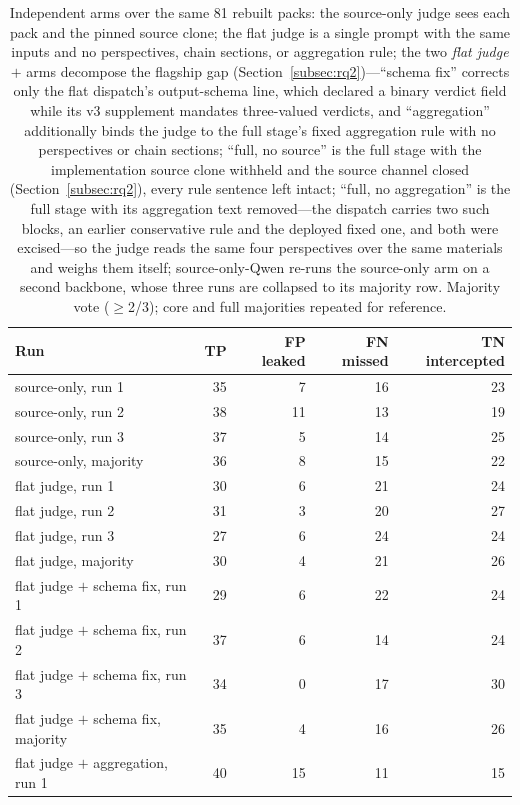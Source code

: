\documentclass[acmsmall,screen,review,anonymous]{acmart}
\begin{document}
\begin{table}[t]
\caption{Independent arms over the same 81 rebuilt packs: the source-only judge sees each pack and the pinned source clone; the flat judge is a single prompt with the same inputs and no perspectives, chain sections, or aggregation rule; the two \emph{flat judge $+$} arms decompose the flagship gap (Section~\ref{subsec:rq2})---``schema fix'' corrects only the flat dispatch's output-schema line, which declared a binary verdict field while its v3 supplement mandates three-valued verdicts, and ``aggregation'' additionally binds the judge to the full stage's fixed aggregation rule with no perspectives or chain sections; ``full, no source'' is the full stage with the implementation source clone withheld and the source channel closed (Section~\ref{subsec:rq2}), every rule sentence left intact; ``full, no aggregation'' is the full stage with its aggregation text removed---the dispatch carries two such blocks, an earlier conservative rule and the deployed fixed one, and both were excised---so the judge reads the same four perspectives over the same materials and weighs them itself; source-only-Qwen re-runs the source-only arm on a second backbone, whose three runs are collapsed to its majority row. Majority vote ($\geq$2/3); core and full majorities repeated for reference.}
\label{tab:rq2-single}
\small
\begin{tabular}{@{}lrrrr@{}}
\toprule
Run & TP & FP leaked & FN missed & TN intercepted \\
\midrule
source-only, run 1 & 35 & 7 & 16 & 23 \\
source-only, run 2 & 38 & 11 & 13 & 19 \\
source-only, run 3 & 37 & 5 & 14 & 25 \\
source-only, majority & 36 & 8 & 15 & 22 \\
flat judge, run 1 & 30 & 6 & 21 & 24 \\
flat judge, run 2 & 31 & 3 & 20 & 27 \\
flat judge, run 3 & 27 & 6 & 24 & 24 \\
flat judge, majority & 30 & 4 & 21 & 26 \\
flat judge $+$ schema fix, run 1 & 29 & 6 & 22 & 24 \\
flat judge $+$ schema fix, run 2 & 37 & 6 & 14 & 24 \\
flat judge $+$ schema fix, run 3 & 34 & 0 & 17 & 30 \\
flat judge $+$ schema fix, majority & 35 & 4 & 16 & 26 \\
flat judge $+$ aggregation, run 1 & 40 & 15 & 11 & 15 \\

\end{tabular}
\end{table}
\end{document}
